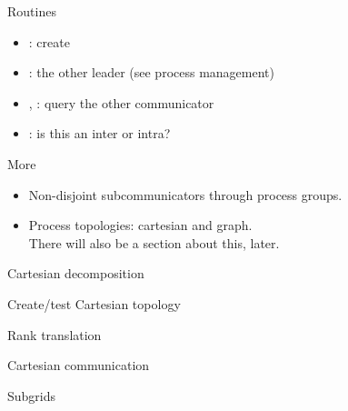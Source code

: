 \begin{numberedframe}{Routines}
  \label{sl:intercomm-routines}
  \begin{itemize}
  \item
    : create
  \item {}: the other leader (see process management)
  \item {}, :
    query the other communicator
  \item {}: is this an inter or intra?
  \end{itemize}
\end{numberedframe}

\begin{numberedframe}{More}
  \begin{itemize}
  \item Non-disjoint subcommunicators through process groups.
  \item Process topologies: cartesian and graph.\\
    There will also be a section about this, later.
  \end{itemize}
\end{numberedframe}


\begin{numberedframe}{Cartesian decomposition}
\end{numberedframe}

\begin{numberedframe}{Create/test Cartesian topology}

\end{numberedframe}

\begin{comment}
  \begin{numberedframe}{Topology testing}
    \cverbatimsnippet{carttypetest}  
  \end{numberedframe}
\end{comment}

\begin{numberedframe}{Rank translation}
\end{numberedframe}

\begin{numberedframe}{Cartesian communication}
\end{numberedframe}

\begin{numberedframe}{Subgrids}
\end{numberedframe}

\endinput

\begin{numberedframe}{}
\begin{lstlisting}
  
\end{lstlisting}
\end{numberedframe}

